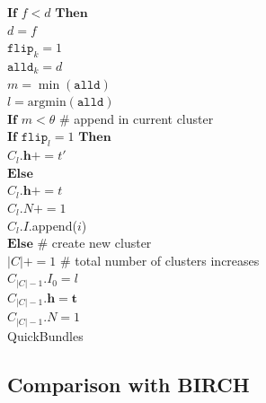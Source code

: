 \documentclass[preprint,authoryear,a4paper,10pt,onecolumn]{elsarticle}
\begin{document}
\begin{appendices}
\begin{algorithm}
\hspace*{4em} $\textbf{If}$ $f < d$ $\textbf{Then}$\\
\hspace*{6em} $d = f$\\
\hspace*{6em} $\texttt{flip}_{k} = 1$\\
\hspace*{4em} $\texttt{alld}_{k} = d$\\
$m=\min(\texttt{alld})$\\
$l=\mathrm{arg min}(\texttt{alld})$\\
$\textbf{If}$ $m < \theta$ \# append in current cluster \\
\hspace*{2em} $\textbf{If}$ $\texttt{flip}_{l}=1$ $\textbf{Then}$\\
\hspace*{4em} $C_{l}.\mathbf{h}+=t'$\\
\hspace*{2em} $\textbf{Else}$ \\
\hspace*{4em} $C_{l}.\mathbf{h}+=t$\\
\hspace*{2em} $C_{l}.N+=1$\\
\hspace*{2em} $C_{l}.I$.append($i$)\\
$\textbf{Else}$ \# create new cluster\\
\hspace*{2em} $|C|+=1$ \# total number of clusters increases\\
\hspace*{2em} $C_{|C|-1}.I_{0}=l$\\
\hspace*{2em} $C_{|C|-1}.\mathbf{h}=\mathbf{t}$\\
\hspace*{2em} $C_{|C|-1}.N=1$\\
\caption{QuickBundles\label{Alg:QuickBundles}}
\end{algorithm}

\subsection{Comparison with BIRCH\label{sub:BIRCH}}



\end{appendices}
\end{document}
